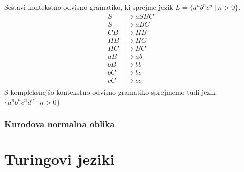 \documentclass[10pt,a4paper,oneside]{book}
\begin{document}
\begin{primeri}
\item Sestavi kontekstno-odvisno gramatiko, ki sprejme jezik $L=\{ a^n b^n c^n\ |\ n>0 \}$.
	\begin{align*}
	S &\rightarrow aSBC\\
	S &\rightarrow aBC \\
	CB &\rightarrow HB \\
	HB &\rightarrow HC \\
	HC &\rightarrow BC \\
	aB &\rightarrow ab \\
	bB &\rightarrow bb \\
	bC &\rightarrow bc \\
	cC &\rightarrow cc \\
	\end{align*}
	S kompleksnejšo kontekstno-odvisno gramatiko sprejmemo tudi jezik $\{ a^n b^n c^n d^n\ |\ n>0 \}$
\end{primeri}
\subsection{Kurodova normalna oblika}


\chapter{Turingovi jeziki}\label{chap:Turingovi jeziki}
\end{document}
